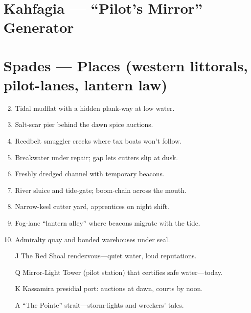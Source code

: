 \section{Kahfagia --- ``Pilot's Mirror'' Generator}
\label{chap:kahfagia}

\section*{Spades --- Places (western littorals, pilot-lanes, lantern law)}
\label{sec:kahfagia-places}
\begin{enumerate}
\setcounter{enumi}{1}
\item Tidal mudflat with a hidden plank-way at low water.
\item Salt-scar pier behind the dawn spice auctions.
\item Reedbelt smuggler creeks where tax boats won't follow.
\item Breakwater under repair; gap lets cutters slip at dusk.
\item Freshly dredged channel with temporary beacons.
\item River sluice and tide-gate; boom-chain across the mouth.
\item Narrow-keel cutter yard, apprentices on night shift.
\item Fog-lane ``lantern alley'' where beacons migrate with the tide.
\item Admiralty quay and bonded warehouses under seal.
\item[J] The Red Shoal rendezvous---quiet water, loud reputations.
\item[Q] Mirror-Light Tower (pilot station) that certifies safe water---today.
\item[K] Kassamira presidial port: auctions at dawn, courts by noon.
\item[A] ``The Pointe'' strait---storm-lights and wreckers' tales.
\end{enumerate}

